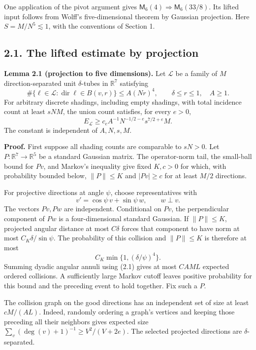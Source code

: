 \documentclass[
  11pt,
  a4paper,
]{article}
\begin{document}
One application of the pivot argument gives
\(\mathsf M_6(4)\Rightarrow\mathsf M_6(33/8)\). Its lifted input follows
from Wolff's five-dimensional theorem by Gaussian projection. Here
\(S=M/N^5\lesssim1\), with the conventions of Section 1.

\hypertarget{the-lifted-estimate-by-projection}{%
\subsection{2.1. The lifted estimate by
projection}\label{the-lifted-estimate-by-projection}}

\textbf{Lemma 2.1 (projection to five dimensions).} Let \(\mathcal L\)
be a family of \(M\) direction-separated unit \(\delta\)-tubes in
\(\mathbb R^7\) satisfying \[
 \#\{\ell\in\mathcal L:\operatorname{dir}\ell\in B(v,r)\}
 \le A(Nr)^4,
 \qquad \delta\le r\le1,\quad A\ge1.
 \tag{2.1}\label{eq:2.1}
\] For arbitrary discrete shadings, including empty shadings, with total
incidence count at least \(sNM\), the union count satisfies, for every
\(e>0\), \[
 E_{\mathcal L}
 \ge c_e A^{-1}N^{-1/2-e}s^{7/2+e}M.
 \tag{2.2}\label{eq:2.2}
\] The constant is independent of \(A,N,s,M\).

\textbf{Proof.} First suppose all shading counts are comparable to
\(sN>0\). Let \(P:\mathbb R^7\to\mathbb R^5\) be a standard Gaussian
matrix. The operator-norm tail, the small-ball bound for \(Pv\), and
Markov's inequality give fixed \(K,c>0\) for which, with probability
bounded below, \(\|P\|\le K\) and \(|Pv|\ge c\) for at least \(M/2\)
directions.

For projective directions at angle \(\psi\), choose representatives with
\[
 v'=\cos\psi\,v+\sin\psi\,w,\qquad w\perp v.
\] The vectors \(Pv,Pw\) are independent. Conditional on \(Pv\), the
perpendicular component of \(Pw\) is a four-dimensional standard
Gaussian. If \(\|P\|\le K\), projected angular distance at most
\(C\delta\) forces that component to have norm at most
\(C_K\delta/\sin\psi\). The probability of this collision and
\(\|P\|\le K\) is therefore at most \[
 C_K\min\{1,(\delta/\psi)^4\}.
 \tag{2.3}\label{eq:2.3}
\] Summing dyadic angular annuli using (2.1) gives at most \(CAM L\)
expected ordered collisions. A sufficiently large Markov cutoff leaves
positive probability for this bound and the preceding event to hold
together. Fix such a \(P\).

The collision graph on the good directions has an independent set of
size at least \(cM/(AL)\). Indeed, randomly ordering a graph's vertices
and keeping those preceding all their neighbors gives expected size
\(\sum_v(\deg(v)+1)^{-1}\ge V^2/(V+2e)\). The selected projected
directions are \(\delta\)-separated.
\end{document}
